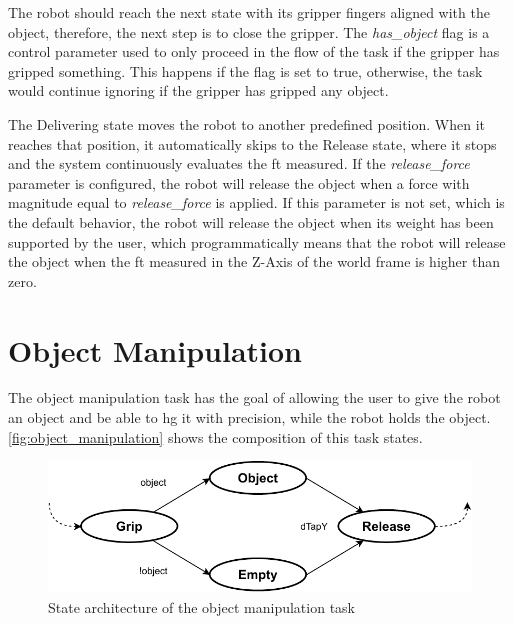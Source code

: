 \par The robot should reach the next state with its gripper fingers aligned with the object, therefore, the next step is to close the gripper. The \textit{has\_object} flag is a control parameter used to only proceed in the flow of the task if the gripper has gripped something. This happens if the flag is set to true, otherwise, the task would continue ignoring if the gripper has gripped any object.

\par The Delivering state moves the robot to another predefined position. When it reaches that position, it automatically skips to the Release state, where it stops and the system continuously evaluates the \ac{ft} measured. If the \textit{release\_force} parameter is configured, the robot will release the object when a force with magnitude equal to \textit{release\_force} is applied. If this parameter is not set, which is the default behavior, the robot will release the object when its weight has been supported by the user, which programmatically means that the robot will release the object when the \ac{ft} measured in the Z-Axis of the world frame is higher than zero. 






\section{Object Manipulation}


\par The object manipulation task has the goal of allowing the user to give the robot an object and be able to \ac{hg} it with precision, while the robot holds the object. \autoref{fig:object_manipulation} shows the composition of this task states.

\begin{figure}[h]
    \centering
    \includegraphics[width=0.7\linewidth]{figs/chp5/object_manipulation.pdf}
    \caption{State architecture of the object manipulation task}
    \label{fig:object_manipulation}
\end{figure}

